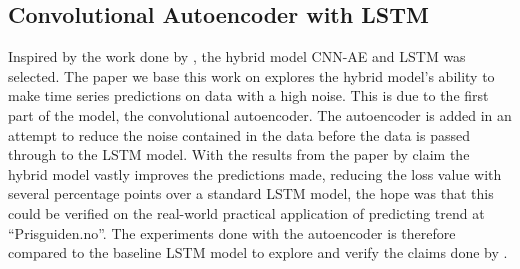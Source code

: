 
\subsection{Convolutional Autoencoder with LSTM}
\label{section:Discussion:Discussion:CNN-AE-LSTM}



Inspired by the work done by \cite{Zhao2019}, the hybrid model CNN-AE and LSTM was selected.
The paper we base this work on explores the hybrid model's ability to make time series predictions
on data with a high noise.
This is due to the first part of the model, the convolutional autoencoder.
The autoencoder is added in an attempt to reduce the noise contained in the data before the data is passed through to the LSTM model.
With the results from the paper by \cite{Zhao2019} claim the hybrid model vastly improves the predictions made, reducing the loss value with
several percentage points over a standard LSTM model, the hope was that this could be verified on the real-world practical application of
predicting trend at ``Prisguiden.no''.
The experiments done with the autoencoder is therefore compared to the baseline LSTM model to explore and verify the claims done by
\cite{Zhao2019}.


